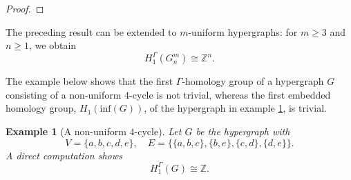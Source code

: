 \documentclass[10pt,a4paper]{amsart}
\newtheorem{ex}[subsection]{Example}
\begin{document}
\begin{proof}
           \end{proof}



%
%
%
The preceding result can be extended to $m$-uniform hypergraphs: for $m\ge3$ and $n\ge1$, we obtain
\[
H_1^\Gamma(G_n^m)\cong\mathbb{Z}^n.
\]

The example below shows that the first $\Gamma$-homology group of a hypergraph $G$ consisting of a non-uniform $4$-cycle is not trivial, whereas the first embedded homology group, $H_1(\text{inf}(G))$, of the hypergraph in example \ref{general 3-cycle}, is trivial. 

\begin{ex}[A non-uniform $4$-cycle]\label{general 3-cycle}
Let $G$ be the hypergraph with
\[
V=\{a,b,c,d,e\}, \quad E=\{\{a,b,c\},\{b,e\},\{c,d\},\{d,e\}\}.
\]
A direct computation shows
\[
H_1^\Gamma(G)\cong \mathbb{Z}.
\]
\end{ex}
\end{document}

